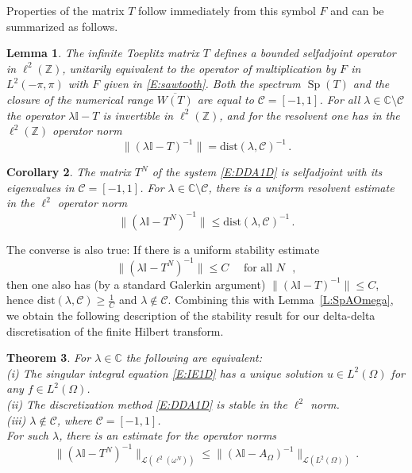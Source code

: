 \documentclass[12pt]{amsart}
\newtheorem{theorem}{Theorem}[section]
\newtheorem{lemma}[theorem]{Lemma}
\newtheorem{corollary}[theorem]{Corollary}
\theoremstyle{definition}
\theoremstyle{remark}
\numberwithin{equation}{section}
\newcommand\C{{\mathbb C}}
\newcommand\Z{{\mathbb Z}}
\newcommand\cC{{\mathcal{C}}}
\newcommand\cL{{\mathcal{L}}}
\newcommand {\Id}{\mathbb I}
\newcommand{\dist}{\mathrm{dist}}
\newcommand{\Sp}{\mathop{\mathrm{Sp}}\nolimits}
\begin{document}
Properties of the matrix $T$ follow immediately from this symbol $F$ and can be summarized as follows.
\begin{lemma}
\label{L:SpT}
The infinite Toeplitz matrix $T$ defines a bounded selfadjoint operator in $\ell^{2}(\Z)$, unitarily equivalent to the operator of multiplication by $F$ in $L^{2}(-\pi,\pi)$ with $F$ given in \eqref{E:sawtooth}.
Both the spectrum $\Sp(T)$ and the closure of the numerical range $\overline{W(T)}$ are equal to 
 $\cC=[-1,1]$.
 For all $\lambda\in\C\setminus\cC$ the operator $\lambda\Id-T$ is invertible in $\ell^{2}(\Z)$, and for the resolvent one has in the $\ell^{2}(\Z)$ operator norm
\begin{equation}
\label{E:resT1D}
 \|(\lambda\Id-T)^{-1}\| = \dist(\lambda,\cC)^{-1}\,.
\end{equation}
\end{lemma} 
\begin{corollary}
 \label{C:StabTN1D}
 The matrix $T^{N}$ of the system \eqref{E:DDA1D} is selfadjoint with its eigenvalues in $\cC=[-1,1]$.  For $\lambda\in\C\setminus\cC$, there is a uniform resolvent estimate in the $\ell^{2}$ operator norm
\begin{equation}
 \label{E:resTN1D}
 \|(\lambda\Id-T^{N})^{-1}\| \le \dist(\lambda,\cC)^{-1}\,.
\end{equation}
\end{corollary}
The converse is also true: If there is a uniform stability estimate
$$
 \|(\lambda\Id-T^{N})^{-1}\| \le C \quad\mbox{ for all $N$ },
$$
then one also has (by a standard Galerkin argument)
$\|(\lambda\Id-T)^{-1}\|\le C$, hence $\dist(\lambda,\cC)\ge\frac1C$ and $\lambda\not\in\cC$.
Combining this with Lemma~\ref{L:SpAOmega}, we obtain the following description of the stability result for our delta-delta discretisation of the finite Hilbert transform.
\begin{theorem}
 \label{T:Stab1D}
 For $\lambda\in\C$ the following are equivalent:\\
 (i) The singular integral equation \eqref{E:IE1D} has a unique solution $u\in L^{2}(\Omega)$ for any $f\in L^{2}(\Omega)$.\\
 (ii) The discretization method \eqref{E:DDA1D} is stable in the $\ell^{2}$ norm.\\
 (iii) $\lambda\not\in\cC$, where $\cC=[-1,1]$.\\
 For such $\lambda$, there is an estimate for the operator norms 
 \begin{equation}
\label{E:Res1D}
 \|(\lambda\Id-T^{N})^{-1}\|_{\cL(\ell^{2}(\omega^{N}))} \le \|(\lambda\Id-A_{\Omega})^{-1}\|_{\cL(L^{2}(\Omega))}\,.
\end{equation}
\end{theorem}
\end{document}

